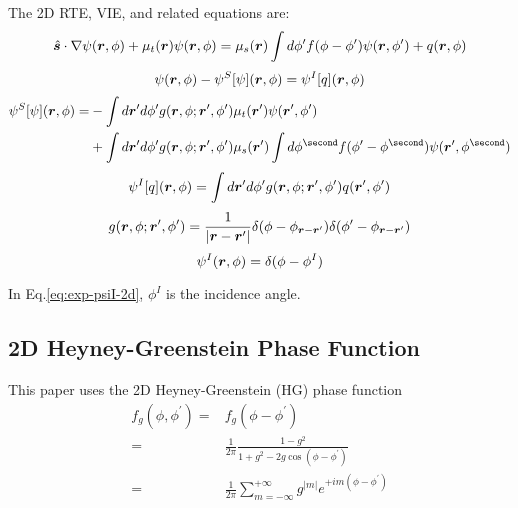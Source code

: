 \documentclass [10pt,letterpaper]{article}
\newcommand{\unitvectorsym}[1]{\hat{\vectorsym{#1}}}
\newcommand{\grad}{\nabla}
\begin{document}
The 2D RTE, VIE, and related equations are:
\begin{equation} \label{eq:def-rte-2d}
	\unitvectorsym{s}\cdot\grad\psi(\vectorsym{r},\phi)
	+\mu_t(\vectorsym{r})\psi(\vectorsym{r},\phi)
	=\mu_s(\vectorsym{r})\int d\phi^\prime f(\phi-\phi^\prime)\psi(\vectorsym{r},\phi^\prime)
	+q(\vectorsym{r},\phi)
\end{equation}
\begin{equation} \label{eq:short-vie-2d}
	\psi(\vectorsym{r},\phi)
	-\psi^S[\psi](\vectorsym{r},\phi)
	=\psi^I[q](\vectorsym{r},\phi)
\end{equation}
\begin{equation} \label{eq:def-psiS-2d}
	\begin{split}
		\psi^S[\psi](\vectorsym{r},\phi)=
		&-\int d\vectorsym{r}^\prime d\phi^\prime
		g(\vectorsym{r},\phi;\vectorsym{r}^\prime,\phi^\prime)
		\mu_t(\vectorsym{r}^\prime) \psi(\vectorsym{r}^\prime,\phi^\prime)
		\\ 
		&+\int d\vectorsym{r}^\prime d\phi^\prime
		g(\vectorsym{r},\phi;\vectorsym{r}^\prime,\phi^\prime)
		\mu_s(\vectorsym{r}^\prime)
		\int d\phi^\second
		f(\phi^\prime-\phi^\second) \psi(\vectorsym{r}^\prime,\phi^\second)
	\end{split}
\end{equation}
\begin{equation} \label{eq:def-psiI-2d}
	\psi^I[q](\vectorsym{r},\phi)=
	\int d\vectorsym{r}^\prime d\phi^\prime
	g(\vectorsym{r},\phi;\vectorsym{r}^\prime,\phi^\prime)
	q(\vectorsym{r}^\prime,\phi^\prime)
\end{equation}
\begin{equation} \label{eq:exp-gf-2d}
	g(\vectorsym{r},\phi;\vectorsym{r}^\prime,\phi^\prime)
	=
	\frac{1}{\lvert\vectorsym{r}-\vectorsym{r}^\prime\rvert}
	\delta(\phi-\phi_{\vectorsym{r}-\vectorsym{r}^\prime})
	\delta(\phi^\prime-\phi_{\vectorsym{r}-\vectorsym{r}^\prime})
\end{equation}
\begin{equation} \label{eq:exp-psiI-2d}
	\psi^I(\vectorsym{r},\phi) = \delta(\phi-\phi^I) 
\end{equation}

In Eq.\eqref{eq:exp-psiI-2d}, $\phi^I$ is the incidence angle.
\subsection{2D Heyney-Greenstein Phase Function}
\label{sub:2d-heyney-greenstein-phase-function} 
This paper uses the 2D Heyney-Greenstein (HG) phase function
\begin{equation} \label{eq:hg-phase-function}
	\begin{split}
		f_g(\phi,\phi^\prime)
		=&
		f_g(\phi-\phi^\prime)
		\\
		=&
		\frac{1}{2\pi}
		\frac{1-g^2}{1+g^2-2g\cos(\phi-\phi^\prime)} 
		\\
		=&
		\frac{1}{2\pi} 
		\sum\limits_{m=-\infty}^{+\infty}
		g^{\lvert m \rvert}
		e^{+i m (\phi-\phi^\prime)} 
	\end{split}
\end{equation}
\end{document}
